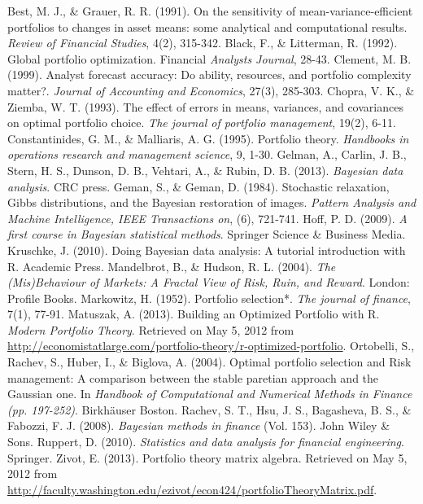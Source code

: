 \documentclass[a4paper]{article}\usepackage[]{graphicx}\usepackage[]{color}
\begin{document}
\begin{thebibliography}{99}
         Best, M. J., \& Grauer, R. R. (1991). On the sensitivity of mean-variance-efficient portfolios to changes in asset means: some analytical and computational results. \textit{Review of Financial Studies}, 4(2), 315-342.
         Black, F., \& Litterman, R. (1992). Global portfolio optimization. Financial \textit{Analysts Journal}, 28-43.
         Clement, M. B. (1999). Analyst forecast accuracy: Do ability, resources, and portfolio complexity matter?.\textit{ Journal of Accounting and Economics}, 27(3), 285-303.
         Chopra, V. K., \& Ziemba, W. T. (1993). The effect of errors in means, variances, and covariances on optimal portfolio choice. \textit{The journal of portfolio management}, 19(2), 6-11.
         Constantinides, G. M., \& Malliaris, A. G. (1995). Portfolio theory. \emph{Handbooks in operations research and management science}, 9, 1-30.
         Gelman, A., Carlin, J. B., Stern, H. S., Dunson, D. B., Vehtari, A., \& Rubin, D. B. (2013). \textit{Bayesian data analysis}. CRC press.
         Geman, S., \& Geman, D. (1984). Stochastic relaxation, Gibbs distributions, and the Bayesian restoration of images.\textit{ Pattern Analysis and Machine Intelligence, IEEE Transactions on}, (6), 721-741.
         Hoff, P. D. (2009). \textit{A first course in Bayesian statistical methods}. Springer Science \& Business Media.
         Kruschke, J. (2010). Doing Bayesian data analysis: A tutorial introduction with R. Academic Press.
         Mandelbrot, B., \& Hudson, R. L. (2004). \textit{The (Mis)Behaviour of Markets: A Fractal View of Risk, Ruin, and Reward}. London: Profile Books.
         Markowitz, H. (1952). Portfolio selection*. \textit{The journal of finance}, 7(1), 77-91. 
     Matuszak, A. (2013). Building an Optimized Portfolio with R. \textit{Modern Portfolio Theory}. Retrieved on May 5, 2012 from \url{http://economistatlarge.com/portfolio-theory/r-optimized-portfolio}. 
        Ortobelli, S., Rachev, S., Huber, I., \& Biglova, A. (2004). Optimal portfolio selection and Risk management: A comparison between the stable paretian approach and the Gaussian one. In \textit{Handbook of Computational and Numerical Methods in Finance (pp. 197-252)}. Birkhäuser Boston.
         Rachev, S. T., Hsu, J. S., Bagasheva, B. S., \& Fabozzi, F. J. (2008). \textit{Bayesian methods in finance} (Vol. 153). John Wiley \& Sons.
         Ruppert, D. (2010). \textit{Statistics and data analysis for financial engineering}. Springer.
         Zivot, E. (2013). Portfolio theory matrix algebra. Retrieved on May 5, 2012 from \url{http://faculty.washington.edu/ezivot/econ424/portfolioTheoryMatrix.pdf}.
\end{thebibliography}
\end{document}
